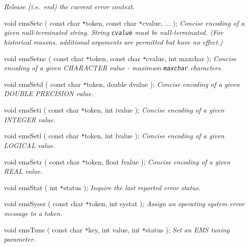 \documentclass[twoside,11pt]{article}
\renewcommand{\_}{\texttt{\symbol{95}}}
\newcommand{\listline}{\hspace{1pt}\\}
\renewcommand{\listline}{}
\begin{document}
\begin {description}
\textit{Release (i.e.\ end) the current error context.}
\item[void emsSetc ( const char \texttt{*}token,
const char \texttt{*}cvalue, ... );] \listline
\textit{Concise encoding of a given null-terminated string. String 
\texttt{cvalue} must be null-terminated. (For historical
reasons, additional arguments are permitted but have no effect.)}
\item[void emsSetnc ( const char \texttt{*}token, const char \texttt{*}cvalue,
int maxchar );] \listline
\textit{Concise encoding of a given CHARACTER value - maximum \texttt{maxchar}
characters.}
\item[void emsSetd ( const char \texttt{*}token, double dvalue );] \listline
\textit{Concise encoding of a given DOUBLE PRECISION value.}
\item[void emsSeti ( const char \texttt{*}token, int ivalue );] \listline
\textit{Concise encoding of a given INTEGER value.}
\item[void emsSetl ( const char \texttt{*}token, int lvalue );] \listline
\textit{Concise encoding of a given LOGICAL value.}
\item[void emsSetr ( const char \texttt{*}token, float fvalue );] \listline
\textit{Concise encoding of a given REAL value.}
\item[void emsStat ( int \texttt{*}status );] \listline
\textit{Inquire the last reported error status.}
\item[void emsSyser ( const char \texttt{*}token, int systat );] \listline
\textit{Assign an operating system error message to a token.}
\item[void emsTune ( const char \texttt{*}key, int value,
int \texttt{*}status );] \listline
\textit{Set an EMS tuning parameter.}
\end {description}

\newpage
\end{document}
